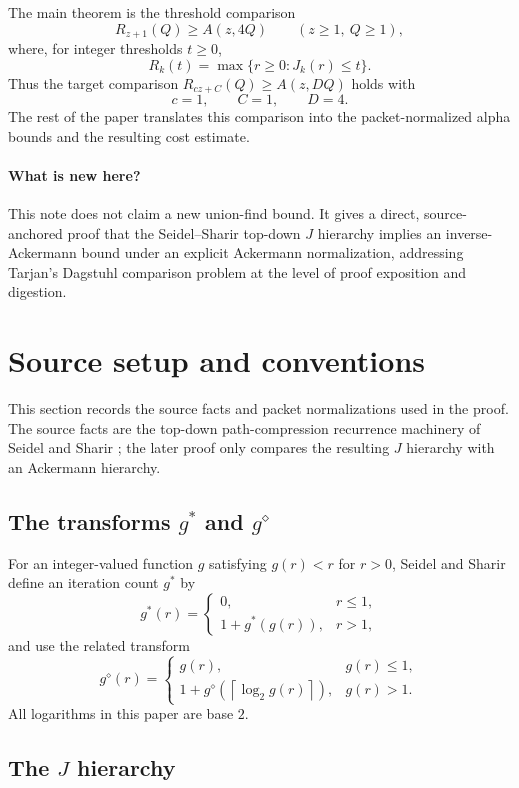 ﻿\documentclass[11pt]{article}
\newcommand{\ceil}[1]{\left\lceil #1 \right\rceil}
\begin{document}
The main theorem is the threshold comparison
\[
R_{z+1}(Q)\ge A(z,4Q)
\qquad (z\ge 1,\ Q\ge 1),
\]
where, for integer thresholds $t\ge0$,
\[
R_k(t)=\max\{r\ge 0:J_k(r)\le t\}.
\]
Thus the target comparison $R_{cz+C}(Q)\ge A(z,DQ)$ holds with
\[
c=1,\qquad C=1,\qquad D=4.
\]
The rest of the paper translates this comparison into the packet-normalized alpha bounds and the resulting cost estimate.

\paragraph{What is new here?}
This note does not claim a new union-find bound.  It gives a direct, source-anchored proof that the Seidel--Sharir top-down $J$ hierarchy implies an inverse-Ackermann bound under an explicit Ackermann normalization, addressing Tarjan's Dagstuhl comparison problem at the level of proof exposition and digestion.

\section{Source setup and conventions}

This section records the source facts and packet normalizations used in the proof.  The source facts are the top-down path-compression recurrence machinery of Seidel and Sharir \cite{SeidelSharir2005}; the later proof only compares the resulting $J$ hierarchy with an Ackermann hierarchy.

\subsection{The transforms \texorpdfstring{$g^*$ and $g^\diamond$}{g* and g-diamond}}

For an integer-valued function $g$ satisfying $g(r)<r$ for $r>0$, Seidel and Sharir define an iteration count $g^*$ by
\[
g^*(r)=
\begin{cases}
0, & r\le 1,\\
1+g^*(g(r)), & r>1,
\end{cases}
\]
and use the related transform
\[
g^\diamond(r)=
\begin{cases}
g(r), & g(r)\le 1,\\[4pt]
1+g^\diamond(\ceil{\log_2 g(r)}), & g(r)>1.
\end{cases}
\]
All logarithms in this paper are base $2$.

\subsection{The \texorpdfstring{$J$}{J} hierarchy}
\end{document}
